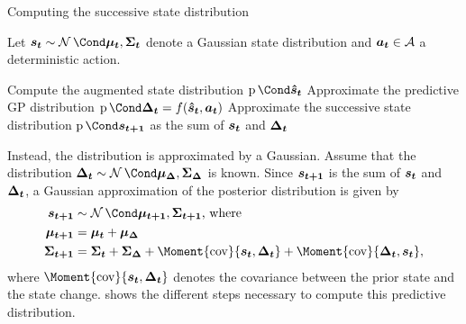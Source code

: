 \begin{algorithm}[t]
    \caption{Computing the successive state distribution}
    \label{alg:linearization}
    Let $\rv{s_t} \sim \Gaussian{\mat{\mu_t}, \mat{\Sigma_t}}$ denote a Gaussian state distribution and $\bm{a_t} \in \mathcal{A}$ a deterministic action.
    \begin{algorithmic}[1]
        \State Compute the augmented state distribution $\Prob{\rv{\hat{s}_t}}$
        \State Approximate the predictive GP distribution $\Prob{\rv{\Delta_t}} = f(\rv{\hat{s}_t}, \mat{a_t})$
        \State Approximate the successive state distribution $\Prob{\rv{s_{t+1}}}$ as the sum of $\bm{s_t}$ and $\bm{\Delta_t}$
    \end{algorithmic}
\end{algorithm}
Instead, the distribution is approximated by a Gaussian.
Assume that the distribution $\rv{\Delta_t} \sim \Gaussian{\mat{\mu_\Delta}, \mat{\Sigma_\Delta}}$ is known.
Since $\bm{s_{t+1}}$ is the sum of $\bm{s_t}$ and $\bm{\Delta_t}$, a Gaussian approximation of the posterior distribution is given by
\begin{align}
    \rv{s_{t+1}} &\sim \Gaussian{\mat{\mu_{t+1}}, \mat{\Sigma_{t+1}}} \text{, where} \\
    \mat{\mu_{t+1}} &= \mat{\mu_t} + \mat{\mu_\Delta} \\
    \mat{\Sigma_{t+1}} &= \mat{\Sigma_t} + \mat{\Sigma_\Delta} + \Moment{\cov}{\rv{s_t}, \rv{\Delta_t}} + \Moment{\cov}{\rv{\Delta_t}, \rv{s_t}},
\end{align}
where $\Moment{\cov}{\rv{s_t}, \rv{\Delta_t}}$ denotes the covariance between the prior state and the state change.
 shows the different steps necessary to compute this predictive distribution.

